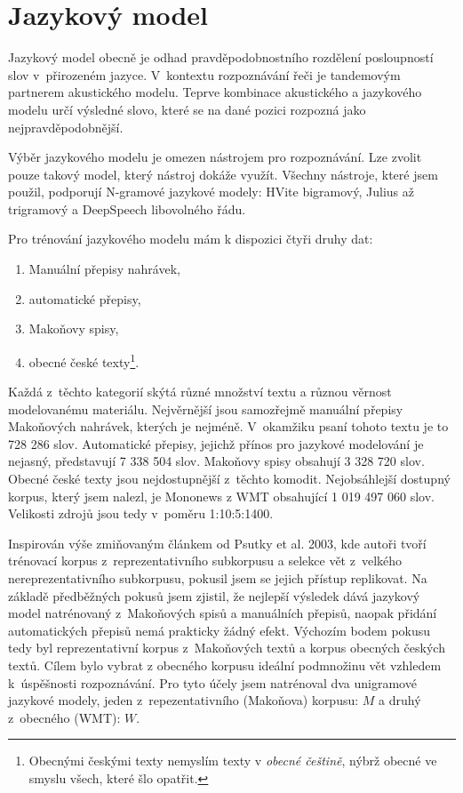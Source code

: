 \section{Jazykový model}
\label{sec:jazykovy-model}

Jazykový model obecně je odhad pravděpodobnostního rozdělení posloupností slov
v~přirozeném jazyce\cite{ponte1998language}. V~kontextu rozpoznávání řeči je tandemovým
partnerem akustického modelu\cite{jelinek1990self}. Teprve kombinace akustického
a jazykového modelu určí výsledné slovo, které se na dané pozici rozpozná jako
nejpravděpodobnější.

Výběr jazykového modelu je omezen nástrojem pro rozpoznávání. Lze zvolit pouze
takový model, který nástroj dokáže využít. Všechny nástroje, které jsem použil,
podporují N-gramové jazykové modely: HVite bigramový, Julius až trigramový a
DeepSpeech libovolného řádu.

Pro trénování jazykového modelu mám k dispozici čtyři druhy dat:
\begin{enumerate}
\item{Manuální přepisy nahrávek,}
\item{automatické přepisy,}
\item{Makoňovy spisy,}
\item{obecné české texty\footnote{Obecnými českými texty nemyslím texty v
{\em obecné češtině}, nýbrž obecné ve smyslu všech, které šlo opatřit.}.}
\end{enumerate}

Každá z~těchto kategorií skýtá různé množství textu a různou věrnost
modelovanému materiálu. Nejvěrnější jsou samozřejmě manuální přepisy Makoňových
nahrávek, kterých je nejméně. V~okamžiku psaní tohoto textu je to 728 286
slov. Automatické přepisy, jejichž přínos pro jazykové modelování je nejasný,
představují 7 338 504 slov. Makoňovy spisy obsahují 3 328 720 slov. Obecné české
texty jsou nejdostupnější z~těchto komodit. Nejobsáhlejší dostupný korpus, který
jsem nalezl, je Mononews z WMT\cite{wmt19} obsahující 1 019 497 060 slov.
Velikosti zdrojů jsou tedy v~poměru 1:10:5:1400.

Inspirován výše zmiňovaným článkem od Psutky et al. 2003\cite{psutka2003large},
kde autoři tvoří trénovací korpus z~reprezentativního subkorpusu a selekce vět
z~velkého nereprezentativního subkorpusu,
pokusil jsem se jejich přístup replikovat. Na základě předběžných pokusů jsem
zjistil, že nejlepší výsledek dává jazykový model natrénovaný z~Makoňových spisů
a manuálních přepisů, naopak přidání automatických přepisů nemá prakticky žádný
efekt. Výchozím bodem pokusu tedy byl reprezentativní korpus z~Makoňových textů
a korpus obecných českých textů. Cílem bylo vybrat z obecného korpusu ideální
podmnožinu vět vzhledem k~úspěšnosti rozpoznávání. Pro tyto účely jsem
natrénoval dva unigramové jazykové modely, jeden z~repezentativního (Makoňova)
korpusu: $M$ a druhý z~obecného (WMT): $W$.

